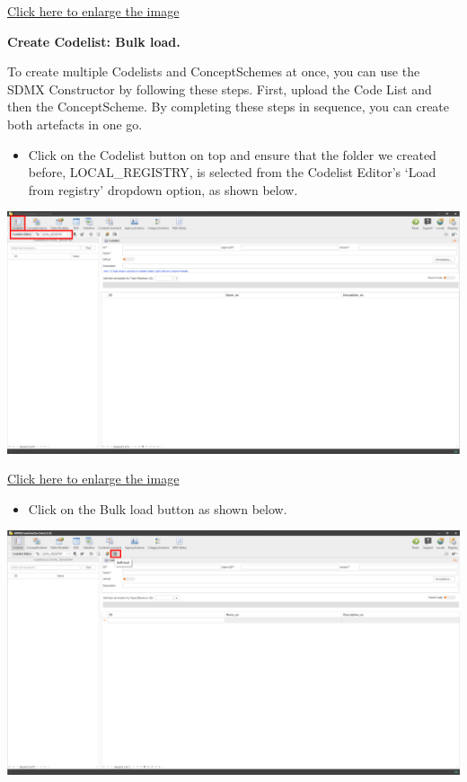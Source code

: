 \documentclass[
]{book}
\providecommand{\tightlist}{%
  \setlength{\itemsep}{0pt}\setlength{\parskip}{0pt}}
\begin{document}
\href{images/image245.png}{Click here to enlarge the image}

\textbf{Create Codelist: Bulk load.}

To create multiple Codelists and ConceptSchemes at once, you can use the SDMX Constructor by following these steps. First, upload the Code List and then the ConceptScheme. By completing these steps in sequence, you can create both artefacts in one go.

\begin{itemize}
\tightlist
\item
  Click on the Codelist button on top and ensure that the folder we created before, LOCAL\_REGISTRY, is selected from the Codelist Editor's `Load from registry' dropdown option, as shown below.
\end{itemize}

\begin{center}\includegraphics[width=1\linewidth]{./images/image082} \end{center}

\href{images/image082.png}{Click here to enlarge the image}

\begin{itemize}
\tightlist
\item
  Click on the Bulk load button as shown below.
\end{itemize}

\begin{center}\includegraphics[width=1\linewidth]{./images/image084} \end{center}
\end{document}
